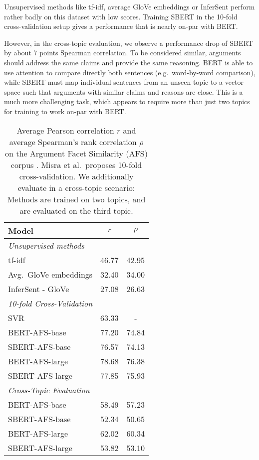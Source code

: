 \documentclass[11pt,a4paper]{article}
\begin{document}
Unsupervised methods like tf-idf, average GloVe embeddings or InferSent perform rather badly on this dataset with low scores. Training SBERT in the 10-fold cross-validation setup gives a performance that is nearly on-par with BERT. 

However, in the cross-topic evaluation, we observe a performance drop of SBERT by about 7 points Spearman correlation. To be considered similar, arguments should address the same claims and provide the same reasoning. BERT is able to use attention to compare directly both sentences (e.g.\ word-by-word comparison), while SBERT must map individual sentences from an unseen topic to a vector space such that arguments with similar claims and reasons are close. This is a much more challenging task, which appears to require more than just two topics for training to work on-par with BERT.  

\begin{table}[h]
	\centering 
	\footnotesize
	\begin{tabular}{|l|c|c|}
		\hline
		\textbf{Model} & $r$ & $\rho$ \\ \hline
		\multicolumn{3}{|l|}{\textit{Unsupervised  methods}} \\ \hline
		tf-idf & 46.77 & 42.95 \\
		Avg.\ GloVe embeddings & 32.40 & 34.00 \\
		InferSent - GloVe & 27.08 &  26.63  \\
		\hline 
		\multicolumn{3}{|l|}{\textit{10-fold Cross-Validation}} \\ \hline
		SVR \cite{MisraEW16} & 63.33 & - \\
		BERT-AFS-base & {77.20}  & {74.84}  \\
		SBERT-AFS-base & 76.57 & 74.13 \\
		BERT-AFS-large & {78.68} & {76.38}  \\
		SBERT-AFS-large & 77.85 & 75.93 \\
		\hline
		\multicolumn{3}{|l|}{\textit{Cross-Topic Evaluation}} \\ \hline
		BERT-AFS-base & {58.49} & {57.23} \\ 
		SBERT-AFS-base & 52.34  & 50.65 \\ 
		BERT-AFS-large & {62.02} & {60.34}  \\ 
		SBERT-AFS-large & 53.82 & 53.10 \\ \hline 		
	\end{tabular}
	\caption{Average Pearson correlation $r$ and average Spearman's rank correlation $\rho$ on the Argument Facet Similarity (AFS) corpus \cite{MisraEW16}. Misra et al.\ proposes 10-fold cross-validation. We additionally evaluate in a cross-topic scenario: Methods are trained on two topics, and are evaluated on the third topic.}
	\label{table_afs}
\end{table}
\end{document}
